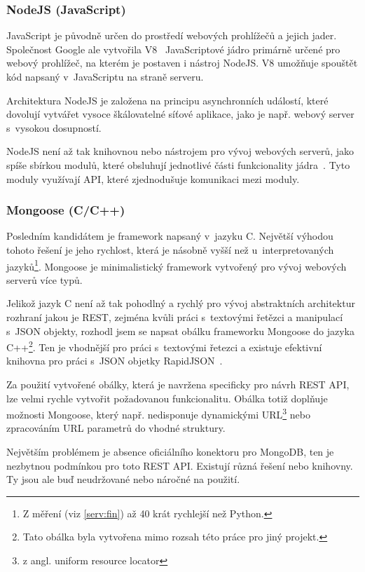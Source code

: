 \subsubsection*{NodeJS (JavaScript)}

JavaScript je původně určen do prostředí webových prohlížečů a jejich jader. Společnost Google ale vytvořila V8~\cite{google:v8} JavaScriptové jádro primárně určené pro webový prohlížeč, na kterém je postaven i nástroj NodeJS. V8 umožňuje spouštět kód napsaný v~JavaScriptu na straně serveru.

Architektura NodeJS je založena na principu asynchronních událostí, které dovolují vytvářet vysoce škálovatelné síťové aplikace, jako je např. webový server s~vysokou dosupností.

NodeJS není až tak knihovnou nebo nástrojem pro vývoj webových serverů, jako spíše sbírkou modulů, které obsluhují jednotlivé části funkcionality jádra~\cite{nodejs}. Tyto moduly využívají API, které zjednodušuje komunikaci mezi moduly.

\subsubsection*{Mongoose (C/C++)}

Posledním kandidátem je framework napsaný v~jazyku C. Největší výhodou tohoto řešení je jeho rychlost, která je násobně vyšší než u~interpretovaných jazyků\footnote{Z měření (viz \ref{serv:fin}) až 40 krát rychlejší než Python.}. Mongoose je minimalistický framework vytvořený pro vývoj webových serverů více typů.

Jelikož jazyk C není až tak pohodlný a rychlý pro vývoj abstraktních architektur rozhraní jakou je REST, zejména kvůli práci s~textovými řetězci a manipulací s~JSON objekty, rozhodl jsem se napsat obálku frameworku Mongoose do jazyka C++\footnote{Tato obálka byla vytvořena mimo rozsah této práce pro jiný projekt.}. Ten je vhodnější pro práci s~textovými řetezci a existuje efektivní knihovna pro práci s~JSON objetky RapidJSON~\cite{js:rjson}.

Za použití vytvořené obálky, která je navržena specificky pro návrh REST API, lze velmi rychle vytvořit požadovanou funkcionalitu. Obálka totiž doplňuje možnosti Mongoose, který např. nedisponuje dynamickými URL\footnote{z angl. uniform resource locator} nebo zpracováním URL parametrů do vhodné struktury.

Největším problémem je absence oficiálního konektoru pro MongoDB, ten je nezbytnou podmínkou pro toto REST API. Existují různá řešení nebo knihovny. Ty jsou ale buď neudržované nebo náročné na použití.

